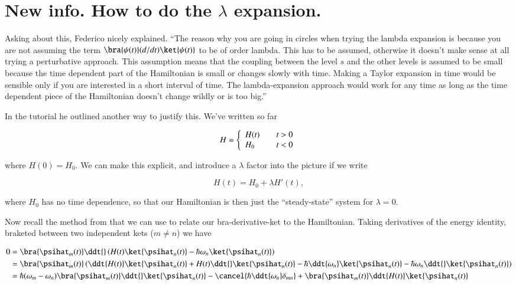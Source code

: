 \section{New info.  How to do the $\lambda$ expansion.}

Asking about this, Federico nicely explained.  ``The reason why you are going in circles when trying the lambda expansion is because you are not assuming the term $\bra{\psi(t)} (d/dt) \ket{\psi(t)}$ to be of order lambda. This has to be assumed, otherwise it doesn't make sense at all trying a perturbative approach. This assumption means that the coupling between the level $s$ and the other levels is assumed to be small because the time dependent part of the Hamiltonian is small or changes slowly with time. Making a Taylor expansion in time would be sensible only if you are interested in a short interval of time. The lambda-expansion approach would work for any time as long as the time dependent piece of the Hamiltonian doesn't change wildly or is too big.''

In the tutorial he outlined another way to justify this.  We've written so far

\begin{equation}\label{eqn:adiabaticApprox:370}
H = 
\left\{
\begin{array}{l l}
H(t) & \quad \mbox{$t > 0$} \\
H_0 & \quad \mbox{$t < 0$} 
\end{array}
\right.
\end{equation}

where $H(0) = H_0$.  We can make this explicit, and introduce a $\lambda$ factor into the picture if we write

\begin{equation}\label{eqn:adiabaticApprox:390}
H(t) = H_0 + \lambda H'(t),
\end{equation}

where $H_0$ has no time dependence, so that our Hamiltonian is then just the ``steady-state'' system for $\lambda = 0$.

Now recall the method from \cite{bohm1989qt} that we can use to relate our bra-derivative-ket to the Hamiltonian.  Taking derivatives of the energy identity, braketed between two independent kets ($m \ne n$) we have

\begin{align*}
0 
&= 
\bra{\psihat_m(t)}
\ddt{} \left(
H(t) \ket{\psihat_n(t)} - \hbar \omega_n \ket{\psihat_n(t)} 
\right) \\
&= 
\bra{\psihat_m(t)}
\left(
\ddt{H(t)} \ket{\psihat_n(t)} 
+H(t) \ddt{} \ket{\psihat_n(t)} 
-\hbar \ddt{\omega_n} \ket{\psihat_n(t)} 
-\hbar \omega_n \ddt{} \ket{\psihat_n(t)} 
\right) \\
&= 
\hbar (\omega_m - \omega_n) 
\bra{\psihat_m(t)}
\ddt{} \ket{\psihat_n(t)} 
-\cancel{\hbar \ddt{\omega_n} \delta_{mn}}
+
\bra{\psihat_m(t)}
\ddt{H(t)} \ket{\psihat_n(t)} 
\end{align*}

